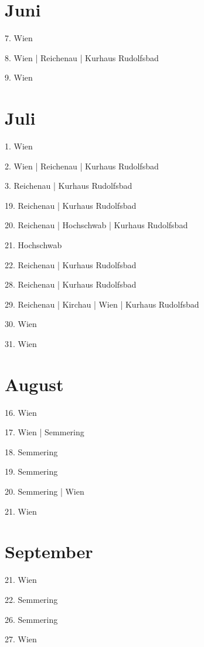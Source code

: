 \documentclass[twoside=false,titlepage=false,open=any, parskip=never, fontsize=10pt, headings=small, chapterprefix=false, appendixprefix=false, DIV=15]{scrbook}
\begin{document}
\begin{multicols}{3}
            \section*{Juni}
            7. Wien\par
            8. Wien | Reichenau | Kurhaus Rudolfsbad\par
            9. Wien\par
            \section*{Juli}
            1. Wien\par
            2. Wien | Reichenau | Kurhaus Rudolfsbad\par
            3. Reichenau | Kurhaus Rudolfsbad\par
            19. Reichenau | Kurhaus Rudolfsbad\par
            20. Reichenau | Hochschwab | Kurhaus Rudolfsbad\par
            21. Hochschwab\par
            22. Reichenau | Kurhaus Rudolfsbad\par
            28. Reichenau | Kurhaus Rudolfsbad\par
            29. Reichenau | Kirchau | Wien | Kurhaus Rudolfsbad\par
            30. Wien\par
            31. Wien\par
            \section*{August}
            16. Wien\par
            17. Wien | Semmering\par
            18. Semmering\par
            19. Semmering\par
            20. Semmering | Wien\par
            21. Wien\par
            \section*{September}
            21. Wien\par
            22. Semmering\par
            26. Semmering\par
            27. Wien\par

\end{multicols}
\end{document}
